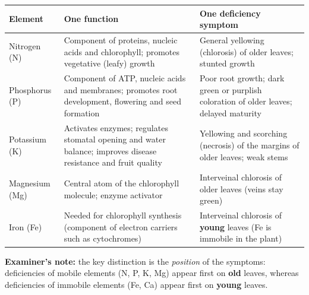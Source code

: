 \documentclass[11pt]{article}
\begin{document}
\begin{corrige}
\begin{center}
\begin{tabularx}{\linewidth}{|l|X|X|}
\hline
\rowcolor{popblueL} \textbf{Element} & \textbf{One function} & \textbf{One deficiency symptom} \\
\hline
Nitrogen (N) & Component of proteins, nucleic acids and chlorophyll; promotes vegetative (leafy) growth & General yellowing (chlorosis) of older leaves; stunted growth \\
\hline
Phosphorus (P) & Component of ATP, nucleic acids and membranes; promotes root development, flowering and seed formation & Poor root growth; dark green or purplish coloration of older leaves; delayed maturity \\
\hline
Potassium (K) & Activates enzymes; regulates stomatal opening and water balance; improves disease resistance and fruit quality & Yellowing and scorching (necrosis) of the margins of older leaves; weak stems \\
\hline
Magnesium (Mg) & Central atom of the chlorophyll molecule; enzyme activator & Interveinal chlorosis of older leaves (veins stay green) \\
\hline
Iron (Fe) & Needed for chlorophyll synthesis (component of electron carriers such as cytochromes) & Interveinal chlorosis of \textbf{young} leaves (Fe is immobile in the plant) \\
\hline
\end{tabularx}
\end{center}
\textbf{Examiner's note:} the key distinction is the \emph{position} of the symptoms: deficiencies of mobile elements (N, P, K, Mg) appear first on \textbf{old} leaves, whereas deficiencies of immobile elements (Fe, Ca) appear first on \textbf{young} leaves.
\end{corrige}
\end{document}
